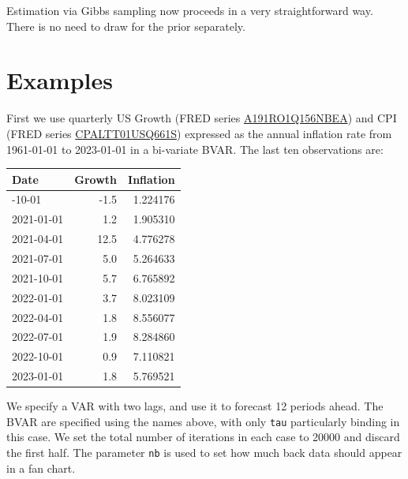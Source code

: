 \documentclass[
  letterpaper,
]{book}
\begin{document}
Estimation via Gibbs sampling now proceeds in a very straightforward
way. There is no need to draw for the prior separately.

\hypertarget{examples}{%
\section{Examples}\label{examples}}

First we use quarterly US Growth (FRED series
\href{https://fred.stlouisfed.org/series/A191RO1Q156NBEA}{A191RO1Q156NBEA})
and CPI (FRED series
\href{https://fred.stlouisfed.org/series/CPALTT01USQ661S}{CPALTT01USQ661S})
expressed as the annual inflation rate from 1961-01-01 to 2023-01-01 in
a bi-variate BVAR. The last ten observations are:

\begin{longtable}[]{@{}lrr@{}}
\toprule\noalign{}
Date & Growth & Inflation \\
\midrule\noalign{}
\endhead
\bottomrule\noalign{}
\endlastfoot
2020-10-01 & -1.5 & 1.224176 \\
2021-01-01 & 1.2 & 1.905310 \\
2021-04-01 & 12.5 & 4.776278 \\
2021-07-01 & 5.0 & 5.264633 \\
2021-10-01 & 5.7 & 6.765892 \\
2022-01-01 & 3.7 & 8.023109 \\
2022-04-01 & 1.8 & 8.556077 \\
2022-07-01 & 1.9 & 8.284860 \\
2022-10-01 & 0.9 & 7.110821 \\
2023-01-01 & 1.8 & 5.769521 \\
\end{longtable}

We specify a VAR with two lags, and use it to forecast 12 periods ahead.
The BVAR are specified using the names above, with only \texttt{tau}
particularly binding in this case. We set the total number of iterations
in each case to 20000 and discard the first half. The parameter
\texttt{nb} is used to set how much back data should appear in a fan
chart.
\end{document}
